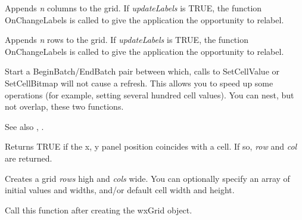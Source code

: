 \label{wxgridappendcols}


Appends {\it n} columns to the grid. If {\it updateLabels} is TRUE,
the function OnChangeLabels is called to give the application the opportunity to relabel.

\label{wxgridappendrows}


Appends {\it n} rows to the grid. If {\it updateLabels} is TRUE,
the function OnChangeLabels is called to give the application the opportunity to relabel.

\label{wxgridbeginbatch}


Start a BeginBatch/EndBatch pair between which, calls to SetCellValue or
SetCellBitmap will not cause a refresh. This allows you to speed up some operations
(for example, setting several hundred cell values). You can nest, but not overlap,
these two functions.

See also , .

\label{wxgridcellhittest}


Returns TRUE if the x, y panel position coincides with a cell. If so, {\it row} and {\it col} are
returned.

\label{wxgridcreategrid}


Creates a grid {\it rows} high and {\it cols} wide. You can optionally specify an array of initial values
and widths, and/or default cell width and height.

Call this function after creating the wxGrid object.


